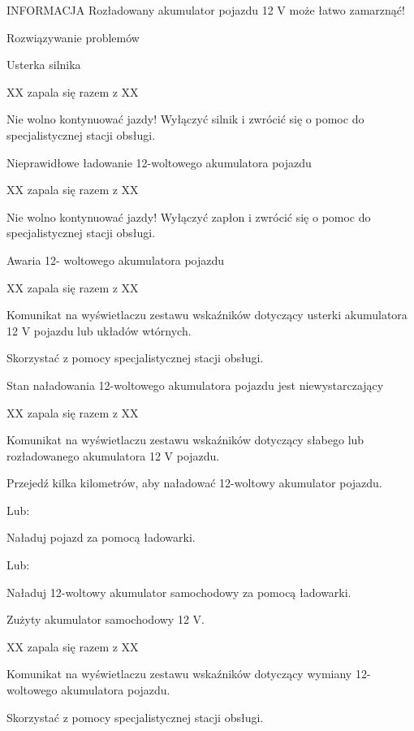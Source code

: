 INFORMACJA
Rozładowany akumulator pojazdu 12 V może łatwo zamarznąć!

Rozwiązywanie problemów

Usterka silnika

XX zapala się razem z XX
\begin{itemizeArrow}
	\itemArrow Nie wolno kontynuować jazdy!
	\itemArrow Wyłączyć silnik i zwrócić się o pomoc do specjalistycznej stacji obsługi.
\end{itemizeArrow}

Nieprawidłowe ładowanie 12-woltowego akumulatora pojazdu

XX zapala się razem z XX
\begin{itemizeArrow}
	\itemArrow Nie wolno kontynuować jazdy!
	\itemArrow Wyłączyć zapłon i zwrócić się o pomoc do specjalistycznej stacji obsługi.
\end{itemizeArrow}

Awaria 12- woltowego akumulatora pojazdu

XX zapala się razem z XX

Komunikat na wyświetlaczu zestawu wskaźników dotyczący usterki akumulatora 12 V pojazdu lub układów wtórnych.

\begin{itemizeArrow}
	\itemArrow Skorzystać z pomocy specjalistycznej stacji obsługi.
\end{itemizeArrow}

Stan naładowania 12-woltowego akumulatora pojazdu jest niewystarczający

XX zapala się razem z XX

Komunikat na wyświetlaczu zestawu wskaźników dotyczący słabego lub rozładowanego akumulatora 12 V pojazdu.
\begin{itemizeArrow}
	\itemArrow Przejedź kilka kilometrów, aby naładować 12-woltowy akumulator pojazdu.
\end{itemizeArrow}
Lub:
\begin{itemizeArrow}
	\itemArrow Naładuj pojazd za pomocą ładowarki.
\end{itemizeArrow}
Lub:
\begin{itemizeArrow}
	\itemArrow Naładuj 12-woltowy akumulator samochodowy za pomocą ładowarki.
\end{itemizeArrow}

Zużyty akumulator samochodowy 12 V.

XX zapala się razem z XX

Komunikat na wyświetlaczu zestawu wskaźników dotyczący wymiany 12-woltowego akumulatora pojazdu.
\begin{itemizeArrow}
	\itemArrow Skorzystać z pomocy specjalistycznej stacji obsługi.
\end{itemizeArrow}

